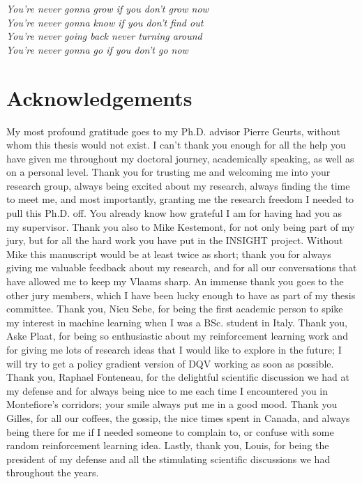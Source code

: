 

\begin{flushright}{\slshape    
You're never gonna grow if you don't grow now \\
You're never gonna know if you don't find out \\
You're never going back never turning around \\
You're never gonna go if you don't go now \\
}
\end{flushright}

\bigskip


\begingroup

\let\clearpage\relax
\let\cleardoublepage\relax
\let\cleardoublepage\relax

\chapter*{Acknowledgements}

\noindent

My most profound gratitude goes to my Ph.D. advisor Pierre Geurts, without whom this thesis would not exist. I can't thank you enough for all the help you have given me throughout my doctoral journey, academically speaking, as well as on a personal level. Thank you for trusting me and welcoming me into your research group, always being excited about my research, always finding the time to meet me, and most importantly, granting me the research freedom I needed to pull this Ph.D. off. You already know how grateful I am for having had you as my supervisor. Thank you also to Mike Kestemont, for not only being part of my jury, but for all the hard work you have put in the INSIGHT project. Without Mike this manuscript would be at least twice as short; thank you for always giving me valuable feedback about my research, and for all our conversations that have allowed me to keep my Vlaams sharp. An immense thank you goes to the other jury members, which I have been lucky enough to have as part of my thesis committee. Thank you, Nicu Sebe, for being the first academic person to spike my interest in machine learning when I was a BSc. student in Italy. Thank you, Aske Plaat, for being so enthusiastic about my reinforcement learning work and for giving me lots of research ideas that I would like to explore in the future; I will try to get a policy gradient version of DQV working as soon as possible. Thank you, Raphael Fonteneau, for the delightful scientific discussion we had at my defense and for always being nice to me each time I encountered you in Montefiore's corridors; your smile always put me in a good mood. Thank you Gilles, for all our coffees, the gossip, the nice times spent in Canada, and always being there for me if I needed someone to complain to, or confuse with some random reinforcement learning idea. Lastly, thank you, Louis, for being the president of my defense and all the stimulating scientific discussions we had throughout the years.     

